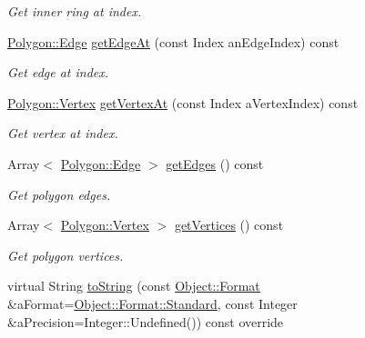 \begin{DoxyCompactItemize}
\begin{DoxyCompactList}\small\item\em Get inner ring at index. \end{DoxyCompactList}\item 
\hyperlink{classostk_1_1math_1_1geom_1_1d2_1_1objects_1_1_polygon_a85e5c92944c126a62464874b5a6ba490}{Polygon\+::\+Edge} \hyperlink{classostk_1_1math_1_1geom_1_1d2_1_1objects_1_1_polygon_a247cba455e33ab1a05c43de43c27ba48}{get\+Edge\+At} (const Index an\+Edge\+Index) const
\begin{DoxyCompactList}\small\item\em Get edge at index. \end{DoxyCompactList}\item 
\hyperlink{classostk_1_1math_1_1geom_1_1d2_1_1objects_1_1_polygon_a2fdf6254b42f087bd9cd0b8b0d7df91c}{Polygon\+::\+Vertex} \hyperlink{classostk_1_1math_1_1geom_1_1d2_1_1objects_1_1_polygon_af3eff08fe9f9c74c5d9aebe7fb5f888f}{get\+Vertex\+At} (const Index a\+Vertex\+Index) const
\begin{DoxyCompactList}\small\item\em Get vertex at index. \end{DoxyCompactList}\item 
Array$<$ \hyperlink{classostk_1_1math_1_1geom_1_1d2_1_1objects_1_1_polygon_a85e5c92944c126a62464874b5a6ba490}{Polygon\+::\+Edge} $>$ \hyperlink{classostk_1_1math_1_1geom_1_1d2_1_1objects_1_1_polygon_ac0c151b62ba0798eb4d86b2458e6d8b0}{get\+Edges} () const
\begin{DoxyCompactList}\small\item\em Get polygon edges. \end{DoxyCompactList}\item 
Array$<$ \hyperlink{classostk_1_1math_1_1geom_1_1d2_1_1objects_1_1_polygon_a2fdf6254b42f087bd9cd0b8b0d7df91c}{Polygon\+::\+Vertex} $>$ \hyperlink{classostk_1_1math_1_1geom_1_1d2_1_1objects_1_1_polygon_a04a97204d397a1c7a919ebf4d73fb537}{get\+Vertices} () const
\begin{DoxyCompactList}\small\item\em Get polygon vertices. \end{DoxyCompactList}\item 
virtual String \hyperlink{classostk_1_1math_1_1geom_1_1d2_1_1objects_1_1_polygon_a6e672ccf5f1101de80e636f097f0a0f7}{to\+String} (const \hyperlink{classostk_1_1math_1_1geom_1_1d2_1_1_object_aa76f9e30caebf4005bafbdff447f66cf}{Object\+::\+Format} \&a\+Format=\hyperlink{classostk_1_1math_1_1geom_1_1d2_1_1_object_aa76f9e30caebf4005bafbdff447f66cfaeb6d8ae6f20283755b339c0dc273988b}{Object\+::\+Format\+::\+Standard}, const Integer \&a\+Precision=Integer\+::\+Undefined()) const override

\end{DoxyCompactItemize}
